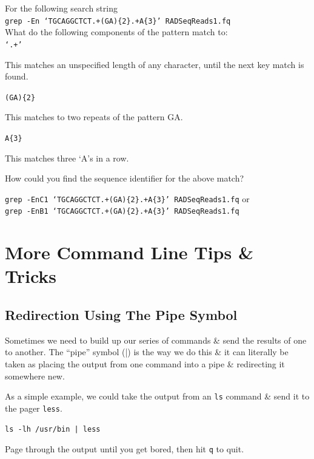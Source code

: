 \documentclass[a4paper,12pt,twoside]{memoir}
\begin{document}
\begin{questions}
For the following search string \\
\texttt{grep -En `TGCAGGCTCT.+(GA)\{2\}.+A\{3\}' RADSeqReads1.fq} \\
What do the following components of the pattern match to: \\
\texttt{`.+'} \\
\begin{answer}
This matches an unspecified length of any character, until the next key match is found. \\
\end{answer}

\texttt{(GA)\{2\}} \\
\begin{answer}
This matches to two repeats of the pattern GA. \\
\end{answer}

\texttt{A\{3\}}\\
\begin{answer}
This matches three `A's in a row. \\
\end{answer}

How could you find the sequence identifier for the above match?\\
\begin{answer}
\texttt{grep -EnC1 `TGCAGGCTCT.+(GA)\{2\}.+A\{3\}' RADSeqReads1.fq} or \\
\texttt{grep -EnB1 `TGCAGGCTCT.+(GA)\{2\}.+A\{3\}' RADSeqReads1.fq}
\end{answer}
\end{questions}

\chapter{More Command Line Tips \& Tricks}

\section{Redirection Using The Pipe Symbol}
\begin{information}
Sometimes we need to build up our series of commands \& send the results of one to another.
The ``pipe'' symbol (|) is the way we do this \& it can literally be taken as placing the output from one command into a pipe \& redirecting it somewhere new.
\end{information}
\begin{steps}
As a simple example, we could take the output from an \texttt{ls} command \& send it to the pager \texttt{less}.
\end{steps}
\begin{lstlisting}
ls -lh /usr/bin | less
\end{lstlisting}
Page through the output until you get bored, then hit \texttt{q} to quit.
\end{document}
